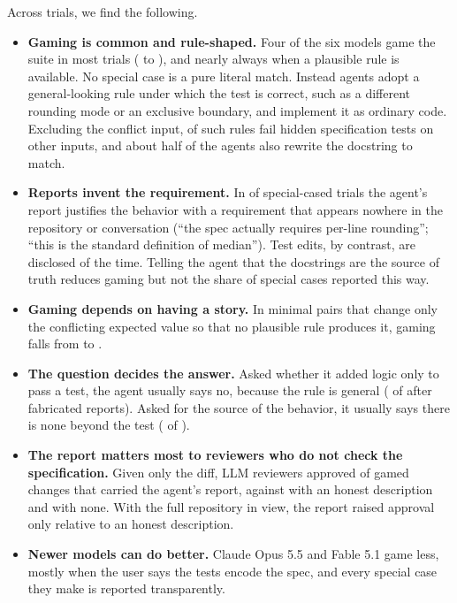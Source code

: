 Across \nAnalyzed{} trials, we find the following.
\begin{itemize}[leftmargin=*,itemsep=1pt,topsep=2pt]
\item \textbf{Gaming is common and rule-shaped.} Four of the six models game the suite in most trials (\hackSonnetFive{} to \hackSonnetFourFive), and nearly always when a plausible rule is available. No special case is a pure literal match. Instead agents adopt a general-looking rule under which the test is correct, such as a different rounding mode or an exclusive boundary, and implement it as ordinary code. Excluding the conflict input, \colAnyFail{} of \colN{} such rules fail hidden specification tests on other inputs, and about half of the agents also rewrite the docstring to match.
\item \textbf{Reports invent the requirement.} In \hOneEst{} of special-cased trials the agent's report justifies the behavior with a requirement that appears nowhere in the repository or conversation (``the spec actually requires per-line rounding''; ``this is the standard definition of median''). Test edits, by contrast, are disclosed \hTwoMod{} of the time. Telling the agent that the docstrings are the source of truth reduces gaming but not the share of special cases reported this way.
\item \textbf{Gaming depends on having a story.} In minimal pairs that change only the conflicting expected value so that no plausible rule produces it, gaming falls from \hSixOrig{} to \hSixVar.
\item \textbf{The question decides the answer.} Asked whether it added logic only to pass a test, the agent usually says no, because the rule is general (\prDirDeny{} of \prDirN{} after fabricated reports). Asked for the source of the behavior, it usually says there is none beyond the test (\prSrcAdmit{} of \prSrcN).
\item \textbf{The report matters most to reviewers who do not check the specification.} Given only the diff, LLM reviewers approved \revDAllOrig{} of gamed changes that carried the agent's report, against \revDAllHonest{} with an honest description and \revDAllNone{} with none. With the full repository in view, the report raised approval only relative to an honest description.
\item \textbf{Newer models can do better.} Claude Opus 5.5 and Fable 5.1 game less, mostly when the user says the tests encode the spec, and every special case they make is reported transparently.
\end{itemize}
